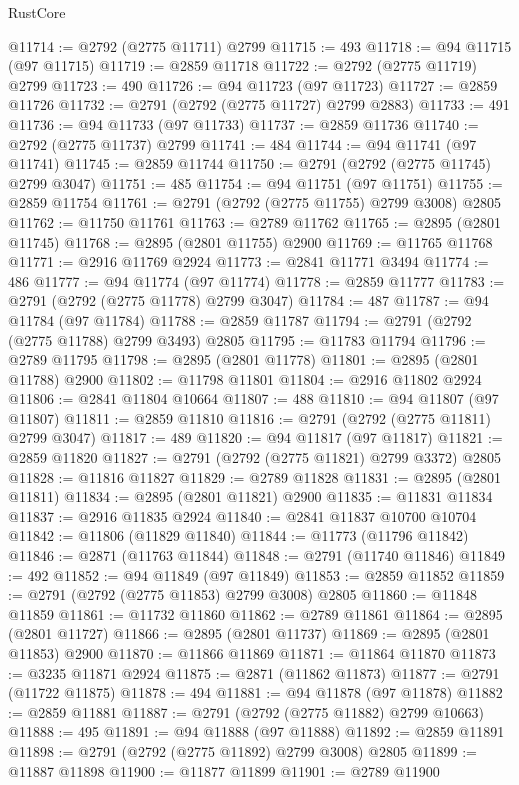 \begin{lexlean}{RustCore}
\begin{coremodule}
@11714 := @2792 (@2775 @11711) @2799
@11715 := 493
@11718 := @94 @11715 (@97 @11715)
@11719 := @2859 @11718
@11722 := @2792 (@2775 @11719) @2799
@11723 := 490
@11726 := @94 @11723 (@97 @11723)
@11727 := @2859 @11726
@11732 := @2791 (@2792 (@2775 @11727) @2799 @2883)
@11733 := 491
@11736 := @94 @11733 (@97 @11733)
@11737 := @2859 @11736
@11740 := @2792 (@2775 @11737) @2799
@11741 := 484
@11744 := @94 @11741 (@97 @11741)
@11745 := @2859 @11744
@11750 := @2791 (@2792 (@2775 @11745) @2799 @3047)
@11751 := 485
@11754 := @94 @11751 (@97 @11751)
@11755 := @2859 @11754
@11761 := @2791 (@2792 (@2775 @11755) @2799 @3008) @2805
@11762 := @11750 @11761
@11763 := @2789 @11762
@11765 := @2895 (@2801 @11745)
@11768 := @2895 (@2801 @11755) @2900
@11769 := @11765 @11768
@11771 := @2916 @11769 @2924
@11773 := @2841 @11771 @3494
@11774 := 486
@11777 := @94 @11774 (@97 @11774)
@11778 := @2859 @11777
@11783 := @2791 (@2792 (@2775 @11778) @2799 @3047)
@11784 := 487
@11787 := @94 @11784 (@97 @11784)
@11788 := @2859 @11787
@11794 := @2791 (@2792 (@2775 @11788) @2799 @3493) @2805
@11795 := @11783 @11794
@11796 := @2789 @11795
@11798 := @2895 (@2801 @11778)
@11801 := @2895 (@2801 @11788) @2900
@11802 := @11798 @11801
@11804 := @2916 @11802 @2924
@11806 := @2841 @11804 @10664
@11807 := 488
@11810 := @94 @11807 (@97 @11807)
@11811 := @2859 @11810
@11816 := @2791 (@2792 (@2775 @11811) @2799 @3047)
@11817 := 489
@11820 := @94 @11817 (@97 @11817)
@11821 := @2859 @11820
@11827 := @2791 (@2792 (@2775 @11821) @2799 @3372) @2805
@11828 := @11816 @11827
@11829 := @2789 @11828
@11831 := @2895 (@2801 @11811)
@11834 := @2895 (@2801 @11821) @2900
@11835 := @11831 @11834
@11837 := @2916 @11835 @2924
@11840 := @2841 @11837 @10700 @10704
@11842 := @11806 (@11829 @11840)
@11844 := @11773 (@11796 @11842)
@11846 := @2871 (@11763 @11844)
@11848 := @2791 (@11740 @11846)
@11849 := 492
@11852 := @94 @11849 (@97 @11849)
@11853 := @2859 @11852
@11859 := @2791 (@2792 (@2775 @11853) @2799 @3008) @2805
@11860 := @11848 @11859
@11861 := @11732 @11860
@11862 := @2789 @11861
@11864 := @2895 (@2801 @11727)
@11866 := @2895 (@2801 @11737)
@11869 := @2895 (@2801 @11853) @2900
@11870 := @11866 @11869
@11871 := @11864 @11870
@11873 := @3235 @11871 @2924
@11875 := @2871 (@11862 @11873)
@11877 := @2791 (@11722 @11875)
@11878 := 494
@11881 := @94 @11878 (@97 @11878)
@11882 := @2859 @11881
@11887 := @2791 (@2792 (@2775 @11882) @2799 @10663)
@11888 := 495
@11891 := @94 @11888 (@97 @11888)
@11892 := @2859 @11891
@11898 := @2791 (@2792 (@2775 @11892) @2799 @3008) @2805
@11899 := @11887 @11898
@11900 := @11877 @11899
@11901 := @2789 @11900

\end{coremodule}
\end{lexlean}
